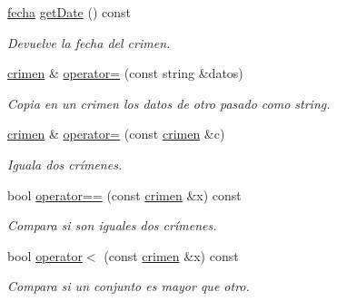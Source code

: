 \begin{DoxyCompactItemize}
\hyperlink{classfecha}{fecha} \hyperlink{classcrimen_a8a6712e536211034819441ab87e1c215}{get\+Date} () const 
\begin{DoxyCompactList}\small\item\em Devuelve la fecha del crimen. \end{DoxyCompactList}\item 
\hyperlink{classcrimen}{crimen} \& \hyperlink{classcrimen_aaf1e77874a28ab1f2f5cd61efe386917}{operator=} (const string \&datos)
\begin{DoxyCompactList}\small\item\em Copia en un crimen los datos de otro pasado como string. \end{DoxyCompactList}\item 
\hyperlink{classcrimen}{crimen} \& \hyperlink{classcrimen_a612c4d3beaabd588703e4a580caf04e5}{operator=} (const \hyperlink{classcrimen}{crimen} \&c)
\begin{DoxyCompactList}\small\item\em Iguala dos crímenes. \end{DoxyCompactList}\item 
bool \hyperlink{classcrimen_aeced9ce4b7486123412975b8884d1ab7}{operator==} (const \hyperlink{classcrimen}{crimen} \&x) const 
\begin{DoxyCompactList}\small\item\em Compara si son iguales dos crímenes. \end{DoxyCompactList}\item 
bool \hyperlink{classcrimen_ac865fdb9712f2426d947b1b5546b50e5}{operator$<$} (const \hyperlink{classcrimen}{crimen} \&x) const 
\begin{DoxyCompactList}\small\item\em Compara si un conjunto es mayor que otro. \end{DoxyCompactList}\end{DoxyCompactItemize}
